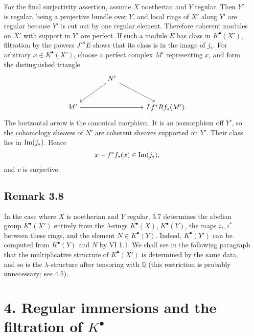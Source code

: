 For the final surjectivity assertion, assume \(X\) noetherian and \(Y\) regular. Then \(Y'\) is regular, being a projective bundle over \(Y\), and local rings of \(X'\) along \(Y'\) are regular because \(Y'\) is cut out by one regular element. Therefore coherent modules on \(X'\) with support in \(Y'\) are perfect. If such a module \(E\) has class in \(K^\bullet(X')\), filtration by the powers \(J'^nE\) shows that its class is in the image of \(j_*\). For arbitrary \(x\in K^\bullet(X')\), choose a perfect complex \(M'\) representing \(x\), and form the distinguished triangle
\[
\begin{tikzcd}[column sep=large,row sep=large]
& N' \arrow[dl] \arrow[dr] &\\
M' \arrow[rr] && Lf^*Rf_*(M').
\end{tikzcd}
\]
The horizontal arrow is the canonical morphism. It is an isomorphism off \(Y'\), so the cohomology sheaves of \(N'\) are coherent sheaves supported on \(Y'\). Their class lies in \(\Imf(j_*)\). Hence
\[
x-f^*f_*(x)\in\Imf(j_*),
\]
and \(v\) is surjective.



\providecommand{\Q}{\mathbb Q}
\providecommand{\bfP}{\mathbf P}
\providecommand{\gr}{\operatorname{gr}}
\providecommand{\Id}{\operatorname{Id}}
\providecommand{\Fil}{\operatorname{Fil}}
\providecommand{\Imf}{\operatorname{Im}}
\providecommand{\rank}{\operatorname{rank}}
\providecommand{\codim}{\operatorname{codim}}
\providecommand{\cJ}{\mathcal J}
\providecommand{\cI}{\mathcal I}
\providecommand{\cN}{\mathcal N}
\providecommand{\cE}{\mathcal E}
\providecommand{\cO}{\mathcal O}


\subsection*{Remark 3.8}

In the case where \(X\) is noetherian and \(Y\) regular, 3.7 determines the abelian group \(K^\bullet(X')\) entirely from the \(\lambda\)-rings \(K^\bullet(X)\), \(K^\bullet(Y)\), the maps \(i_*,i^*\) between these rings, and the element \(N\in K^\bullet(Y)\). Indeed, \(K^\bullet(Y')\) can be computed from \(K^\bullet(Y)\) and \(N\) by VI 1.1. We shall see in the following paragraph that the multiplicative structure of \(K^\bullet(X')\) is determined by the same data, and so is the \(\lambda\)-structure after tensoring with \(\mathbb Q\) (this restriction is probably unnecessary; see 4.5).

\section*{4. Regular immersions and the filtration of \(K^\bullet\)}

